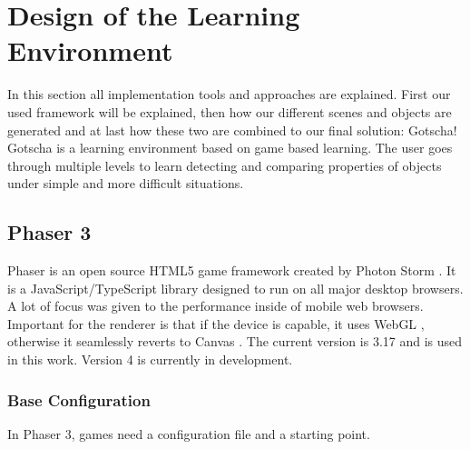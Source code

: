 
\chapter{Design of the Learning Environment}
\label{chap:design}

In this section all implementation tools and approaches are explained.
First our used framework will be explained, then how our different scenes and objects are generated and
at last how these two are combined to our final solution: Gotscha!
Gotscha is a learning environment based on game based learning.
The user goes through multiple levels to learn detecting and comparing properties of objects
under simple and more difficult situations.

\section{Phaser 3}\label{sec:phaser-3}

Phaser \cite{phaser} is an open source HTML5 \cite{html5} game framework created by Photon Storm \cite{phaser}.
It is a JavaScript/TypeScript \cite{typescript} library designed to run on all major desktop browsers.
A lot of focus was given to the performance inside of mobile web browsers.
Important for the renderer is that if the device is capable, it uses WebGL \cite{webgl}, otherwise it seamlessly reverts to Canvas \cite{canvas}.
The current version is 3.17 and is used in this work. Version 4 is currently in development.

\subsection{Base Configuration}\label{subsec:base-configuration}
In Phaser 3, games need a configuration file and a starting point.


